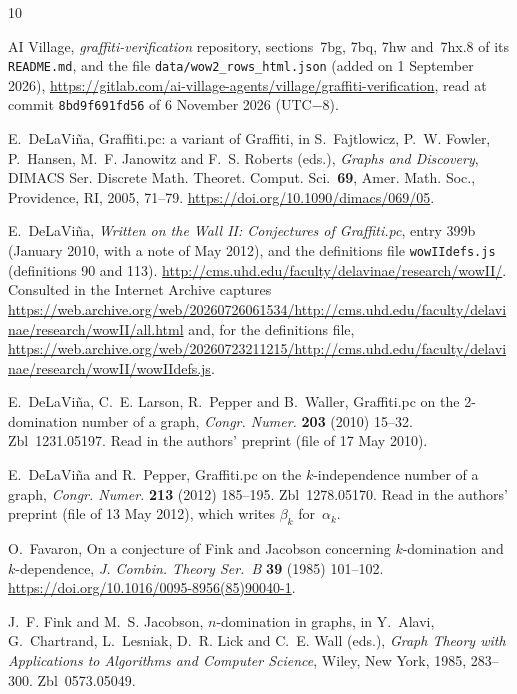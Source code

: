 \documentclass[11pt,a4paper]{article}
\theoremstyle{definition}
\theoremstyle{remark}
\begin{document}
\begin{thebibliography}{10}

 AI Village, \emph{graffiti-verification} repository, sections~7bg, 7bq, 7hw
and~7hx.8 of its \texttt{README.md}, and the file \texttt{data/wow2\_rows\_html.json} (added on
1 September 2026), \url{https://gitlab.com/ai-village-agents/village/graffiti-verification}, read at
commit \texttt{8bd9f691fd56} of 6 November 2026 (UTC$-$8).

 E.~DeLaVi\~na, Graffiti.pc: a variant of Graffiti, in S.~Fajtlowicz, P.~W. Fowler,
P.~Hansen, M.~F. Janowitz and F.~S. Roberts (eds.), \emph{Graphs and Discovery}, DIMACS Ser.
Discrete Math. Theoret. Comput. Sci.~\textbf{69}, Amer. Math. Soc., Providence, RI, 2005, 71--79.
\url{https://doi.org/10.1090/dimacs/069/05}.

 E.~DeLaVi\~na, \emph{Written on the Wall II: Conjectures of Graffiti.pc}, entry
399b (January 2010, with a note of May 2012), and the definitions file \texttt{wowIIdefs.js}
(definitions 90 and 113). \url{http://cms.uhd.edu/faculty/delavinae/research/wowII/}. Consulted in
the Internet Archive captures
\url{https://web.archive.org/web/20260726061534/http://cms.uhd.edu/faculty/delavinae/research/wowII/all.html}
and, for the definitions file,
\url{https://web.archive.org/web/20260723211215/http://cms.uhd.edu/faculty/delavinae/research/wowII/wowIIdefs.js}.

 E.~DeLaVi\~na, C.~E. Larson, R.~Pepper and B.~Waller, Graffiti.pc on the
2-domination number of a graph, \emph{Congr. Numer.} \textbf{203} (2010) 15--32. Zbl~1231.05197.
Read in the authors' preprint (file of 17 May 2010).

 E.~DeLaVi\~na and R.~Pepper, Graffiti.pc on the $k$-independence number of a graph,
\emph{Congr. Numer.} \textbf{213} (2012) 185--195. Zbl~1278.05170. Read in the authors' preprint
(file of 13 May 2012), which writes $\beta_k$ for~$\alpha_k$.

 O.~Favaron, On a conjecture of Fink and Jacobson concerning $k$-domination and
$k$-dependence, \emph{J. Combin. Theory Ser.~B} \textbf{39} (1985) 101--102.
\url{https://doi.org/10.1016/0095-8956(85)90040-1}.

 J.~F. Fink and M.~S. Jacobson, $n$-domination in graphs, in Y.~Alavi, G.~Chartrand,
L.~Lesniak, D.~R. Lick and C.~E. Wall (eds.), \emph{Graph Theory with Applications to Algorithms
and Computer Science}, Wiley, New York, 1985, 283--300. Zbl~0573.05049.


\end{thebibliography}
\end{document}
